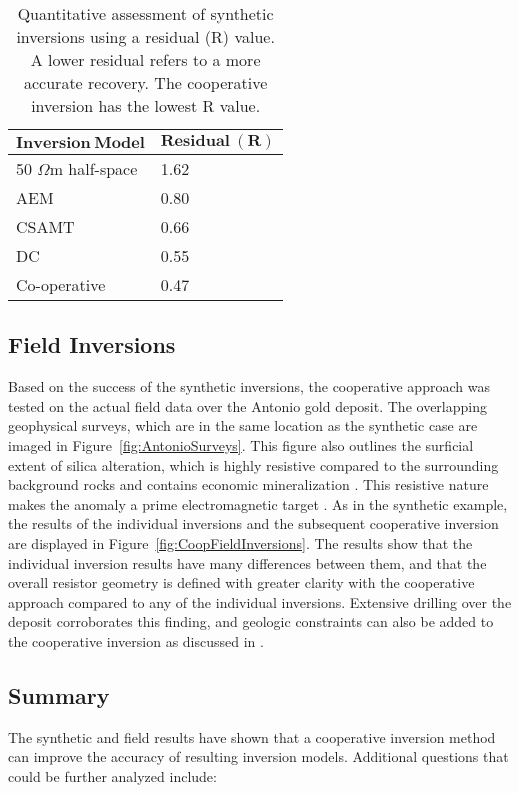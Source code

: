 \documentclass[letterpaper,11pt]{article}
\begin{document}
\begin{table}[h]
\caption{Quantitative assessment of synthetic inversions using a residual (R) value. A lower residual refers to a more accurate recovery. The cooperative inversion has the lowest R value.}
\begin{center}
\begin{tabular}{ll}
$ \mathbf{Inversion \ Model} $    & $ \mathbf{Residual \ (R)} $\\ \hline
50 $ \Omega $m half-space   & 1.62        \\ \hline
AEM                         & 0.80        \\ \hline
CSAMT                       & 0.66        \\ \hline
DC                          & 0.55        \\ \hline
Co-operative                & 0.47        \\ \hline
\end{tabular}
\label{table:R}
\end{center}
\end{table}


\subsection{Field Inversions}
Based on the success of the synthetic inversions, the cooperative approach was tested on the actual field data over the Antonio gold deposit. The overlapping  geophysical surveys, which are in the same location as the synthetic case are imaged in Figure~\ref{fig:AntonioSurveys}. This figure also outlines the surficial extent of silica alteration, which is highly resistive compared to the surrounding background rocks and contains economic mineralization \cite{Goldie2000}. This resistive nature makes the anomaly a prime electromagnetic target \cite[]{Oldenburg2004}. As in the synthetic example, the results of the individual inversions and the subsequent cooperative inversion are displayed in Figure~\ref{fig:CoopFieldInversions}.  The results show that the individual inversion results have many differences between them, and that the overall resistor geometry is defined with greater clarity with the cooperative approach compared to any of the individual inversions.  Extensive drilling over the deposit corroborates this finding, and geologic constraints can also be added to the cooperative inversion as discussed in \cite{McMillan2014}.

\subsection{Summary}
The synthetic and field results have shown that a cooperative inversion method can improve the accuracy of resulting inversion models. Additional questions that could be further analyzed include:
\end{document}
